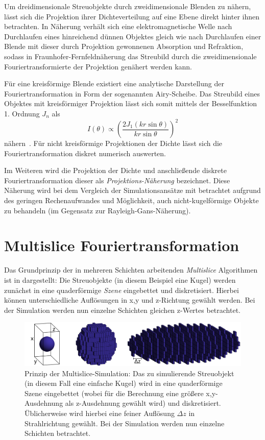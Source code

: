 Um dreidimensionale Streuobjekte durch zweidimensionale Blenden zu nähern, lässt sich die Projektion ihrer Dichteverteilung auf eine Ebene direkt hinter ihnen betrachten. In Näherung verhält sich eine elektromagnetische Welle nach Durchlaufen eines hinreichend dünnen Objektes gleich wie nach Durchlaufen einer Blende mit dieser durch Projektion gewonnenen Absorption und Refraktion, sodass in Fraunhofer-Fernfeldnäherung das Streubild durch die zweidimensionale Fouriertransformierte der Projektion genähert werden kann.
	
Für eine kreisförmige Blende existiert eine analytische Darstellung der Fouriertransformation in Form der sogenannten Airy-Scheibe. Das Streubild eines Objektes mit kreisförmiger Projektion lässt sich somit mittels der Besselfunktion 1. Ordnung $J_n$ als
\begin{equation}
	I(\theta) \propto \left ( \frac{2 J_1(kr \sin \theta)}{kr \sin \theta} \right )^2 
\end{equation}
nähern~\cite{born1980}. Für nicht kreisförmige Projektionen der Dichte lässt sich die Fouriertransformation diskret numerisch auswerten.

Im Weiteren wird die Projektion der Dichte und anschließende diskrete Fouriertransformation dieser als \textit{Projektions-Näherung} bezeichnet. Diese Näherung wird bei dem Vergleich der Simulationsansätze mit betrachtet aufgrund des geringen Rechenaufwandes und Möglichkeit, auch nicht-kugelförmige Objekte zu behandeln (im Gegensatz zur Rayleigh-Gans-Näherung).


\section{Multislice Fouriertransformation}
Das Grundprinzip der in mehreren Schichten arbeitenden \textit{Multislice} Algorithmen ist in  dargestellt: Die Streuobjekte (in diesem Beispiel eine Kugel) werden zunächst in eine quaderförmige \textit{Szene} eingebettet und diskretisiert. Hierbei können unterschiedliche Auflösungen in x,y und z-Richtung gewählt werden. Bei der Simulation werden nun einzelne Schichten gleichen z-Wertes betrachtet.
\begin{figure}
	\centering
	\includegraphics[width=1\textwidth]{images/multislice_sphere.png}
	\caption[Prinzip Multislice]{Prinzip der Multislice-Simulation: Das zu simulierende Streuobjekt (in diesem Fall eine einfache Kugel) wird in eine quaderförmige Szene eingebettet (wobei für die Berechnung eine größere x,y-Ausdehnung als z-Ausdehnung gewählt wird) und diskretisiert. Üblicherweise wird hierbei eine feiner Auflösung $\Delta z$ in Strahlrichtung gewählt. Bei der Simulation werden nun einzelne Schichten betrachtet.}
	\label{fig:multislice_prinzip}
\end{figure} 

